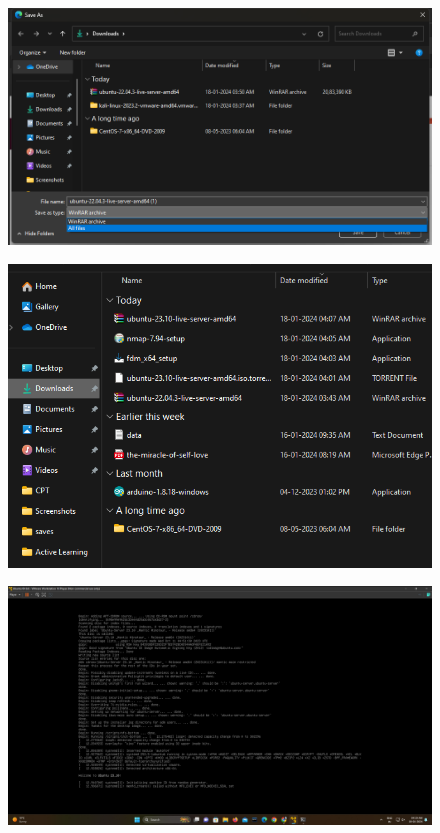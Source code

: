 \documentclass[11pt]{article}
\begin{document}
\begin{figure}[H]
    \centering
    \includegraphics[width=.95\textwidth]{screenshots/4.png}
    \caption{}
\end{figure}
\begin{figure}[H]
    \centering
    \includegraphics[width=.95\textwidth]{screenshots/5.png}
    \caption{}
\end{figure}
\begin{figure}[H]
    \centering
    \includegraphics[width=.95\textwidth]{screenshots/6.png}
    \caption{}
\end{figure}
\end{document}

